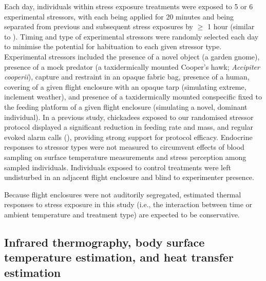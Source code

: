 \documentclass[12pt]{article}
\begin{document}
\noindent Each day, individuals within stress exposure treatments were exposed to 5 or 6 experimental stressors, with each being applied for 20 minutes and being separated from previous and subsequent stress exposures by $\geq$ 1 hour (similar to \citealt{rich_2005}). Timing and type of experimental stressors were randomly selected each day to minimise the potential for habituation to each given stressor type. Experimental stressors included the presence of a novel object (a garden gnome), presence of a mock predator (a taxidermically mounted Cooper's hawk; \textit{Accipiter cooperii}), capture and restraint in an opaque fabric bag, presence of a human, covering of a given flight enclosure with an opaque tarp (simulating extreme, inclement weather), and presence of a taxidermically mounted conspecific fixed to the feeding platform of a given flight enclosure (simulating a novel, dominant individual). In a previous study, chickadees exposed to our randomised stressor protocol displayed a significant reduction in feeding rate and mass, and regular evoked alarm calls (\citealt{robertson_2020b}), providing strong support for protocol efficacy. Endocrine responses to stressor types were not measured to circumvent effects of blood sampling on surface temperature measurements and stress perception among sampled individuals. Individuals exposed to control treatments were left undisturbed in an adjacent flight enclosure and blind to experimenter presence. \vspace{1cm}    

\noindent Because flight enclosures were not auditorily segregated, estimated thermal responses to stress exposure in this study (i.e., the interaction between time or ambient temperature and treatment type) are expected to be conservative. \vspace{0.5cm}

\subsection{Infrared thermography, body surface temperature estimation, and heat transfer estimation}
\vspace{0.5cm}
\end{document}
